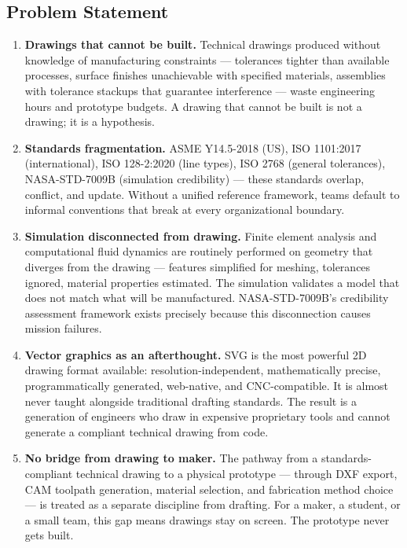 \documentclass[11pt,letterpaper]{article}
\begin{document}
\subsection{Problem Statement}

\begin{enumerate}
  \item \textbf{Drawings that cannot be built.} Technical drawings produced without knowledge of manufacturing constraints --- tolerances tighter than available processes, surface finishes unachievable with specified materials, assemblies with tolerance stackups that guarantee interference --- waste engineering hours and prototype budgets. A drawing that cannot be built is not a drawing; it is a hypothesis.
  \item \textbf{Standards fragmentation.} ASME Y14.5-2018 (US), ISO 1101:2017 (international), ISO 128-2:2020 (line types), ISO 2768 (general tolerances), NASA-STD-7009B (simulation credibility) --- these standards overlap, conflict, and update. Without a unified reference framework, teams default to informal conventions that break at every organizational boundary.
  \item \textbf{Simulation disconnected from drawing.} Finite element analysis and computational fluid dynamics are routinely performed on geometry that diverges from the drawing --- features simplified for meshing, tolerances ignored, material properties estimated. The simulation validates a model that does not match what will be manufactured. NASA-STD-7009B's credibility assessment framework exists precisely because this disconnection causes mission failures.
  \item \textbf{Vector graphics as an afterthought.} SVG is the most powerful 2D drawing format available: resolution-independent, mathematically precise, programmatically generated, web-native, and CNC-compatible. It is almost never taught alongside traditional drafting standards. The result is a generation of engineers who draw in expensive proprietary tools and cannot generate a compliant technical drawing from code.
  \item \textbf{No bridge from drawing to maker.} The pathway from a standards-compliant technical drawing to a physical prototype --- through DXF export, CAM toolpath generation, material selection, and fabrication method choice --- is treated as a separate discipline from drafting. For a maker, a student, or a small team, this gap means drawings stay on screen. The prototype never gets built.
\end{enumerate}
\end{document}
